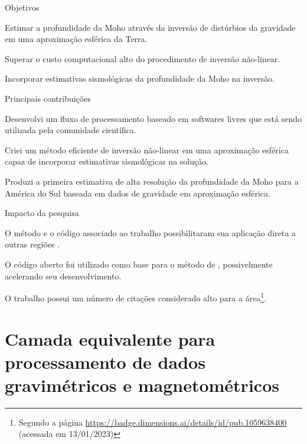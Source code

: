 \documentclass[10pt,a4paper,oneside]{book}
\begin{document}
\begin{fancyenum}{\faBullseye}{Objetivos}
  \item Estimar a profundidade da Moho através da inversão de distúrbios da
    gravidade em uma aproximação esférica da Terra.
  \item Superar o custo computacional alto do procedimento de inversão
    não-linear.
  \item Incorporar estimativas sismológicas da profundidade da Moho na inversão.
\end{fancyenum}
\begin{fancyenum}{\faLightbulb}{Principais contribuições}
  \item Desenvolvi um fluxo de processamento baseado em softwares livres que
    está sendo utilizada pela comunidade científica.
  \item Criei um método eficiente de inversão não-linear em uma aproximação
    esférica capaz de incorporar estimativas sismológicas na solução.
  \item Produzi a primeira estimativa de alta resolução da profundidade da Moho
    para a América do Sul baseada em dados de gravidade em aproximação
    esférica.
\end{fancyenum}
\begin{fancyenum}{\faRocket}{Impacto da pesquisa}
  \item O método e o código associado ao trabalho \citet{Uieda2017}
    possibilitaram sua aplicação direta a outras regiões \citep[e.g.,][entre
    outros]{Chisenga2019, Sobh2020, KemgangGhomsi2021}.
  \item O código aberto foi utilizado como base para o método de
    \citet{Haas2020}, possivelmente acelerando seu desenvolvimento.
  \item O trabalho \citet{Uieda2017} possui um número de citações considerado
    alto para a área\footnote{Segundo a página
    \url{https://badge.dimensions.ai/details/id/pub.1059638400} (acessada em
    13/01/2023)}.
\end{fancyenum}


\section{Camada equivalente para processamento de dados gravimétricos e magnetométricos}
\label{sec_eql}
\end{document}
